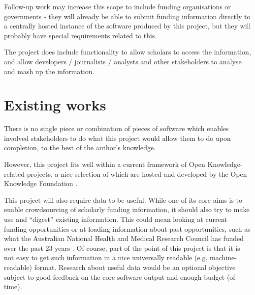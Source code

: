 Follow-up work may increase this scope to include funding organisations or governments - they will already be able to submit funding information directly to a centrally hosted instance of the software produced by this project, but they will probably have special requirements related to this.

The project does include functionality to allow scholars to access the information, and allow developers / journalists / analysts and other stakeholders to analyse and mash up the information.

\section{Existing works}
There is no single piece or combination of pieces of software which enables involved stakeholders to do what this project would allow them to do upon completion, to the best of the author's knowledge.

However, this project fits well within a current framework of Open Knowledge-related projects, a nice selection of which are hosted and developed by the Open Knowledge Foundation \cite{okfn-labs} \cite{okfn-github}.

This project will also require data to be useful. While one of its core aims is to enable crowdsourcing of scholarly funding information, it should also try to make use and ``digest'' existing information. This could mean looking at current funding opportunities \cite{rcuk-india} \cite{ahrc-opps} \cite{bbsrc-opps} \cite{epsrc-opps} or at loading information about past opportunities, such as what the Australian National Health and Medical Research Council has funded over the past 23 years \cite{au-nhmrc}. Of course, part of the point of this project is that it is not easy to get such information in a nice universally readable (e.g. machine-readable) format. Research about useful data would be an optional objective subject to good feedback on the core software output and enough budget (of time).